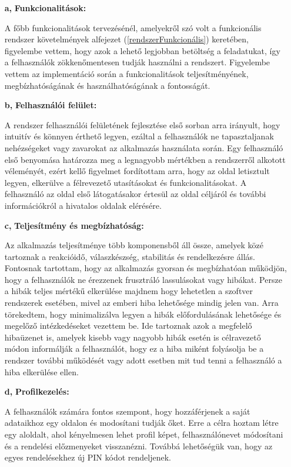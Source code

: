 \begin{itemize}
  	\item[\textbf{a,}] \textbf{Funkcionalitások:}

A főbb funkcionalitások tervezésénél, amelyekről szó volt a funkcionális rendszer követelmények alfejezet (\ref{rendszerFunkcionális}) keretében, figyelembe vettem, hogy azok a lehető legjobban betöltség a feladatukat, így a felhasználók zökkenőmentesen tudják használni a rendszert. Figyelembe vettem az implementáció során a funkcionalitások teljesítményének, megbízhatóságának és használhatóságának a fontosságát.

	\item[\textbf{b,}] \textbf{Felhasználói felület:}

A rendszer felhasználói felületének fejlesztése első sorban arra irányult, hogy intuitív és könnyen érthető legyen, ezáltal a felhasználók ne tapasztaljanak nehézségeket vagy zavarokat az alkalmazás használata során. Egy felhasználó első benyomása határozza meg a legnagyobb mértékben a rendszerről alkotott véleményét, ezért kellő figyelmet fordítottam arra, hogy az oldal letisztult legyen, elkerülve a félrevezető utasításokat és funkcionalitásokat. A felhasználó az oldal első látogatásakor értesül az oldal céljáról és további információkról a hivatalos oldalak elérésére.

	\item[\textbf{c,}] \textbf{Teljesítmény és megbízhatóság:}

Az alkalmazás teljesítménye több komponensből áll össze, amelyek közé tartoznak a reakcióidő, válaszkészség, stabilitás és rendelkezésre állás. Fontosnak tartottam, hogy az alkalmazás gyorsan és megbízhatóan működjön, hogy a felhasználók ne érezzenek frusztráló lassulásokat vagy hibákat. Persze a hibák teljes mértékű elkerülése majdnem hogy lehetetlen a szoftver rendszerek esetében, mivel az emberi hiba lehetősége mindig jelen van. Arra törekedtem, hogy minimalizálva legyen a hibák előfordulásának lehetősége és megelőző intézkedéseket vezettem be. Ide tartoznak azok a megfelelő hibaüzenet is, amelyek kisebb vagy nagyobb hibák esetén is célravezető módon informálják a felhasználót, hogy ez a hiba miként folyásolja be a rendszer további működését vagy adott esetben mit tud tenni a felhasználó a hiba elkerülése ellen.

	\item[\textbf{d,}] \textbf{Profilkezelés:}

A felhasználók számára fontos szempont, hogy hozzáférjenek a saját adataikhoz egy oldalon és modosítani tudják őket. Erre a célra hoztam létre egy aloldalt, ahol kényelmesen lehet profil képet, felhasználónevet módosítani és a rendelési előzmenyeket visszanézni. Továbbá lehetőségük van, hogy az egyes rendelésekhez új PIN kódot rendeljenek.


\end{itemize}
